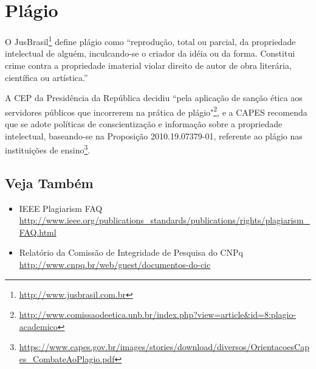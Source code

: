 \section{Plágio}%
O JusBrasil\footnote{\url{http://www.jusbrasil.com.br}} define plágio como
``reprodução, total ou parcial, da propriedade intelectual de alguém, inculcando-se
o criador da idéia ou da forma. Constitui crime contra a propriedade imaterial
violar direito de autor de obra literária, científica ou artística.''


A \acrfull{CEP} da Presidência da República decidiu  ``pela
aplicação de sanção ética aos servidores públicos que incorrerem na prática de
plágio"\footnote{\url{http://www.comissaodeetica.unb.br/index.php?view=article&id=8:plagio-academico}},
e a \acrfull{CAPES} recomenda que se adote políticas de conscientização e informação
sobre a propriedade intelectual, baseando-se na Proposição 2010.19.07379-01,
referente ao plágio nas instituições de ensino\footnote{\url{https://www.capes.gov.br/images/stories/download/diversos/OrientacoesCapes_CombateAoPlagio.pdf}}.


\subsection{Veja Também}
\begin{itemize}
	\item IEEE Plagiarism FAQ
		\\\url{http://www.ieee.org/publications_standards/publications/rights/plagiarism_FAQ.html}
	\item Relatório da Comissão de Integridade de Pesquisa do CNPq
		\\\url{http://www.cnpq.br/web/guest/documentos-do-cic}
\end{itemize}

\fi


